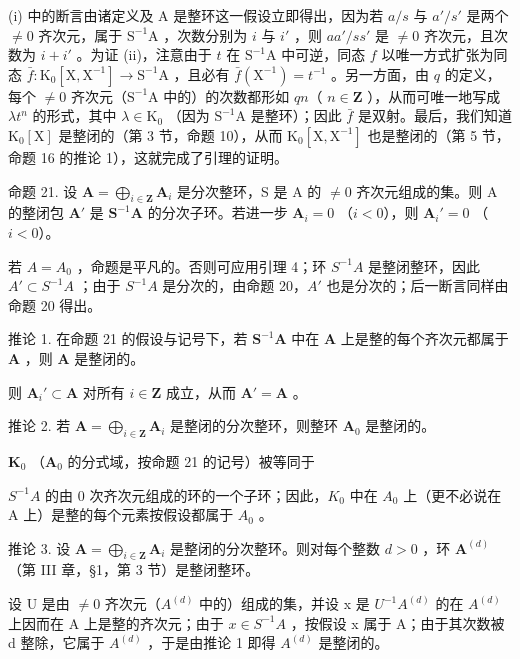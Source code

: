 (i) 中的断言由诸定义及 A 是整环这一假设立即得出，因为若 \(a/s\) 与 \(a'/s'\) 是两个 \(\neq 0\) 齐次元，属于 \(\mathrm{S}^{-1}\mathrm{A}\) ，次数分别为 \(i\) 与 \(i'\) ，则 \(aa'/ss'\) 是 \(\neq 0\) 齐次元，且次数为 \(i+i'\) 。为证 (ii)，注意由于 \(t\) 在 \(\mathrm{S}^{-1}\mathrm{A}\) 中可逆，同态 \(f\) 以唯一方式扩张为同态 \(\bar{f}: \mathrm{K}_0[\mathrm{X}, \mathrm{X}^{-1}] \to \mathrm{S}^{-1}\mathrm{A}\) ，且必有 \(\bar{f}(\mathrm{X}^{-1}) = t^{-1}\) 。另一方面，由 \(q\) 的定义，每个 \(\neq 0\) 齐次元（\(\mathrm{S}^{-1}\mathrm{A}\) 中的）的次数都形如 \(qn\)（ \(n \in \mathbf{Z}\) ），从而可唯一地写成 \(\lambda t^n\) 的形式，其中 \(\lambda \in \mathrm{K}_0\) （因为 \(\mathrm{S}^{-1}\mathrm{A}\) 是整环）；因此 \(\bar{f}\) 是双射。最后，我们知道 \(\mathrm{K}_0[\mathrm{X}]\) 是整闭的（第 3 节，命题 10），从而 \(\mathrm{K}_0[\mathrm{X}, \mathrm{X}^{-1}]\) 也是整闭的（第 5 节，命题 16 的推论 1），这就完成了引理的证明。

命题 21. 设 \(\mathbf{A} = \bigoplus_{i\in \mathbf{Z}}\mathbf{A}_i\) 是分次整环，S 是 A 的 \(\neq 0\) 齐次元组成的集。则 A 的整闭包 \(\mathbf{A}'\) 是 \(\mathbf{S}^{-1}\mathbf{A}\) 的分次子环。若进一步 \(\mathbf{A}_i = 0\) （\(i < 0\)），则 \(\mathbf{A}_i' = 0\) （\(i < 0\)）。

若 \(A = A_{0}\) ，命题是平凡的。否则可应用引理 4；环 \(S^{-1}A\) 是整闭整环，因此 \(A' \subset S^{-1}A\) ；由于 \(S^{-1}A\) 是分次的，由命题 20，\(A'\) 也是分次的；后一断言同样由命题 20 得出。

推论 1. 在命题 21 的假设与记号下，若 \(\mathbf{S}^{-1}\mathbf{A}\) 中在 \(\mathbf{A}\) 上是整的每个齐次元都属于 \(\mathbf{A}\) ，则 \(\mathbf{A}\) 是整闭的。

则 \(\mathbf{A}_i' \subset \mathbf{A}\) 对所有 \(i \in \mathbf{Z}\) 成立，从而 \(\mathbf{A}' = \mathbf{A}\) 。

推论 2. 若 \(\mathbf{A} = \bigoplus_{i\in \mathbf{Z}}\mathbf{A}_i\) 是整闭的分次整环，则整环 \(\mathbf{A}_0\) 是整闭的。

\(\mathbf{K}_0\) （\(\mathbf{A}_0\) 的分式域，按命题 21 的记号）被等同于

\(S^{-1}A\) 的由 0 次齐次元组成的环的一个子环；因此，\(K_{0}\) 中在 \(A_{0}\) 上（更不必说在 A 上）是整的每个元素按假设都属于 \(A_{0}\) 。

推论 3. 设 \(\mathbf{A} = \bigoplus_{i\in \mathbf{Z}}\mathbf{A}_i\) 是整闭的分次整环。则对每个整数 \(d > 0\) ，环 \(\mathbf{A}^{(d)}\) （第 III 章，§1，第 3 节）是整闭整环。

设 U 是由 \(\neq0\) 齐次元（\(A^{(d)}\) 中的）组成的集，并设 x 是 \(U^{-1}A^{(d)}\) 的在 \(A^{(d)}\) 上因而在 A 上是整的齐次元；由于 \(x\in S^{-1}A\) ，按假设 x 属于 A；由于其次数被 d 整除，它属于 \(A^{(d)}\) ，于是由推论 1 即得 \(A^{(d)}\) 是整闭的。

